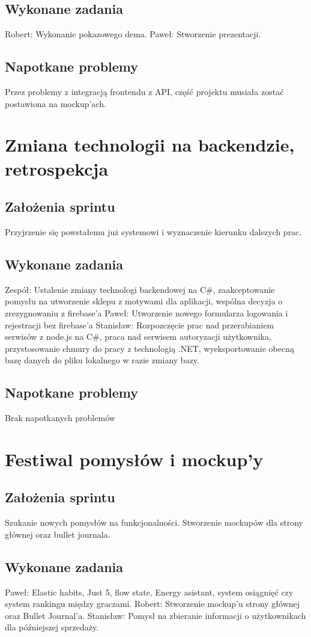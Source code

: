 \documentclass[a4paper,11pt]{report}
\begin{document}
\subsection {Wykonane zadania}
Robert: Wykonanie pokazowego dema. 
Paweł: Stworzenie prezentacji.
\subsection {Napotkane problemy}
Przez problemy z integracją frontendu z API, część projektu musiała zostać postawiona na mockup'ach.

\section {Zmiana technologii na backendzie, retrospekcja}
\subsection {Założenia sprintu}
Przyjrzenie się powstałemu już systemowi i wyznaczenie kierunku dalszych prac.
\subsection {Wykonane zadania}
Zespół: Ustalenie zmiany technologi backendowej na C\#, zaakceptowanie pomysłu na utworzenie sklepu z motywami dla aplikacji, wspólna decyzja o zrezygnowaniu z firebase'a
Paweł: Utworzenie nowego formularza logowania i rejestracji bez firebase'a
Stanisław: Rozpozczęcie prac nad przerabianiem serwisów z node.js na C\#, praca nad serwisem autoryzacji użytkownika, przystosowanie chmury do pracy z technologią .NET, wyeksportowanie obecną bazę danych do pliku lokalnego w razie zmiany bazy.
\subsection {Napotkane problemy}
Brak napotkanych problemów

\section {Festiwal pomysłów i mockup'y}
\subsection {Założenia sprintu}
Szukanie nowych pomysłów na funkcjonalności. Stworzenie mockupów dla strony głównej oraz bullet journala. 
\subsection {Wykonane zadania}
Paweł: Elastic habits, Just 5, flow state, Energy asistant, system osiągnięć czy system rankingu między graczami.
Robert: Stworzenie mockup'u strony głównej oraz Bullet Journal'a.
Stanisław: Pomysł na zbieranie informacji o użytkownikach dla późniejszej sprzedaży.
\end{document}
